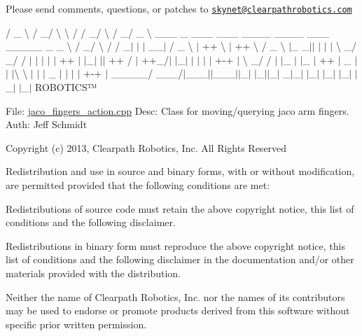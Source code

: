 Please send comments, questions, or patches to \href{mailto:skynet@clearpathrobotics.com}{\tt skynet@clearpathrobotics.\+com}



 / \+\_\+ \textbackslash{} / \+\_\+/ \textbackslash{} \textbackslash{} / / \+\_\+/ \textbackslash{} / \+\_\+/ \+\_\+ \textbackslash{} \+\_\+\+\_\+\+\_\+ \+\_\+ \+\_\+\+\_\+\+\_\+ \+\_\+\+\_\+\+\_\+ \+\_\+\+\_\+\+\_\+\+\_\+ \+\_\+\+\_\+\+\_\+\+\_\+ \+\_\+\+\_\+\+\_\+ \+\_\+\+\_\+\+\_\+\+\_\+\+\_\+ \+\_\+ \+\_\+ \textbackslash{} / \+\_\+/ \textbackslash{} / / \+\_\+$|$ $\vert$ $\vert$ \+\_\+\+\_\+$\vert$ / \+\_\+ \textbackslash{} $\vert$ ++ \textbackslash{} $\vert$ ++ \textbackslash{} / \+\_\+ \textbackslash{} $\vert$\+\_\+ \+\_\+$\vert$$\vert$ $\vert$ $\vert$ $\vert$ \textbackslash{} \+\_\+/ \+\_\+/ / $\vert$ $\vert$ $\vert$ $\vert$ $\vert$ ++ $\vert$ $\vert$\+\_\+$\vert$ $\vert$$\vert$ ++ / $\vert$ ++\+\_\+/$\vert$ $\vert$\+\_\+$\vert$ $\vert$ $\vert$ $\vert$ $\vert$ +-\/+ $\vert$ \textbackslash{} \+\_\+/ / $\vert$ $\vert$\+\_\+ $\vert$ $\vert$\+\_\+ $\vert$ ++ $\vert$ \+\_\+ $\vert$$\vert$ $\vert$\textbackslash{} \textbackslash{} $\vert$ $\vert$ $\vert$ \+\_\+ $\vert$ $\vert$ $\vert$ $\vert$ +-\/+ $\vert$ \+\_\+\+\_\+\+\_\+\+\_\+\+\_\+/ \+\_\+\+\_\+\+\_\+/$\vert$\+\_\+\+\_\+\+\_\+$\vert$$\vert$\+\_\+\+\_\+\+\_\+$\vert$$\vert$\+\_\+$\vert$ $\vert$\+\_\+$\vert$$\vert$\+\_\+$\vert$ \+\_\+$|$\+\_\+$\vert$ $\vert$\+\_\+$\vert$ $\vert$\+\_\+$\vert$ $\vert$\+\_\+$\vert$ $\vert$\+\_\+$\vert$ $\vert$\+\_\+$\vert$ R\+O\+B\+O\+T\+I\+C\+S™

File\+: \hyperlink{jaco__fingers__action_8cpp}{jaco\+\_\+fingers\+\_\+action.\+cpp} Desc\+: Class for moving/querying jaco arm fingers. Auth\+: Jeff Schmidt

Copyright (c) 2013, Clearpath Robotics, Inc. All Rights Reserved

Redistribution and use in source and binary forms, with or without modification, are permitted provided that the following conditions are met\+:
\begin{DoxyItemize}
\item Redistributions of source code must retain the above copyright notice, this list of conditions and the following disclaimer.
\item Redistributions in binary form must reproduce the above copyright notice, this list of conditions and the following disclaimer in the documentation and/or other materials provided with the distribution.
\item Neither the name of Clearpath Robotics, Inc. nor the names of its contributors may be used to endorse or promote products derived from this software without specific prior written permission.
\end{DoxyItemize}

